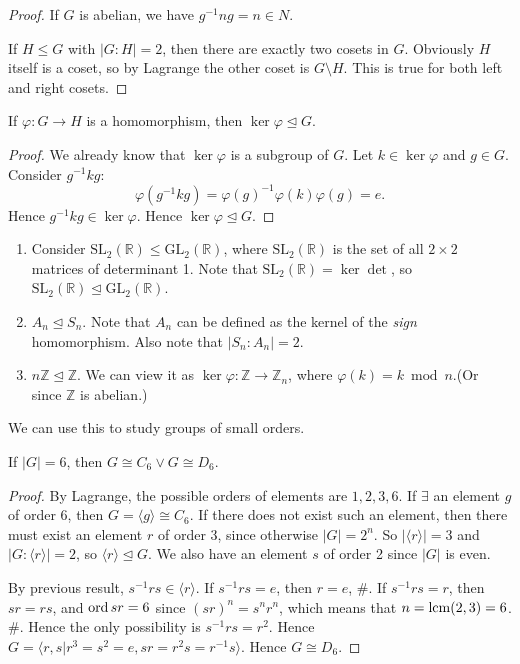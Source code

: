 \documentclass[a4paper]{article}
\begin{document}
\begin{proof}
  If $G$ is abelian, we have $ g^{-1}ng=n\in N $.

  If $H\le G$ with $ |G:H|=2$, then there are exactly two cosets in
  $G$. Obviously $H$ itself is a coset, so by Lagrange the other
  coset is $ G \setminus H $. This is true for both left and right cosets.
\end{proof}
\begin{proposition}\label{prop:4.4}
  If $ \varphi:G\to H $ is a homomorphism, then $ \ker \varphi
  \trianglelefteq G $.
\end{proposition}
\begin{proof}
  We already know that $ \ker \varphi $ is a subgroup of $G$. Let $
  k\in \ker \varphi $ and $g\in G$. Consider $ g^{-1}kg $:
  \[
    \varphi(g^{-1}kg)=\varphi(g)^{-1}\varphi(k) \varphi(g)=e
  .\]
  Hence $ g^{-1}kg\in \ker \varphi $. Hence $\ker \varphi \trianglelefteq G$.
\end{proof}
\begin{example}
  \begin{enumerate}[(1)]
    \item Consider $ \mathrm{SL}_2(\mathbb{R})\le
      \mathrm{GL_2}(\mathbb{R}) $, where $ \mathrm{SL}_2(\mathbb{R})
      $ is the set of all $ 2 \times 2 $ matrices of determinant 1.
      Note that $ \mathrm{SL}_2(\mathbb{R}) = \ker \det $, so $
      \mathrm{SL}_2(\mathbb{R})\trianglelefteq  \mathrm{GL_2}(\mathbb{R}) $.
    \item $ A_n\trianglelefteq S_n $. Note that $ A_n $ can be
      defined as the kernel of the \textit{sign} homomorphism. Also
      note that $ |S_n:A_n|=2 $.
    \item $ n \mathbb{Z} \trianglelefteq \mathbb{Z} $. We can view it
      as $ \ker \varphi: \mathbb{Z} \to \mathbb{Z}_n $, where $
      \varphi(k)=k \bmod n $.(Or since $ \mathbb{Z} $ is abelian.)
  \end{enumerate}
\end{example}
We can use this to study groups of small orders.
\begin{proposition}\label{prop:4.6}
  If $ |G|=6 $, then $ G \cong C_6 \lor G \cong D_6 $.
\end{proposition}
\begin{proof}
  By Lagrange, the possible orders of elements are $1,2,3,6$. If $
  \exists $ an element $g$ of order 6, then $ G = \langle g \rangle
  \cong C_6 $. If there does not exist such an element, then there
  must exist an element $ r $ of order 3, since otherwise $|G|=2^n$.
  So $ |\langle r \rangle |=3 $ and $ |G:\langle r \rangle |=2 $, so
  $ \langle r \rangle \trianglelefteq G $. We also have an element
  $s$ of order 2 since $|G|$ is even.

  By previous result, $ s^{-1}rs\in \langle r \rangle $. If $
  s^{-1}rs=e $, then $ r=e $, \#. If $ s^{-1}rs=r $, then $sr=rs$,
  and $ \operatorname{ord} sr=6 $ since $ (sr)^n=s^nr^n $, which means that $
  n=\operatorname{lcm}(2,3)=6 $. \#. Hence the only possibility is $ s^{-1}rs=r^2
  $. Hence $ G=\langle r,s|r^3=s^2=e, sr=r^2s=r^{-1}s \rangle  $.
  Hence $ G \cong D_6 $.
\end{proof}
\end{document}
